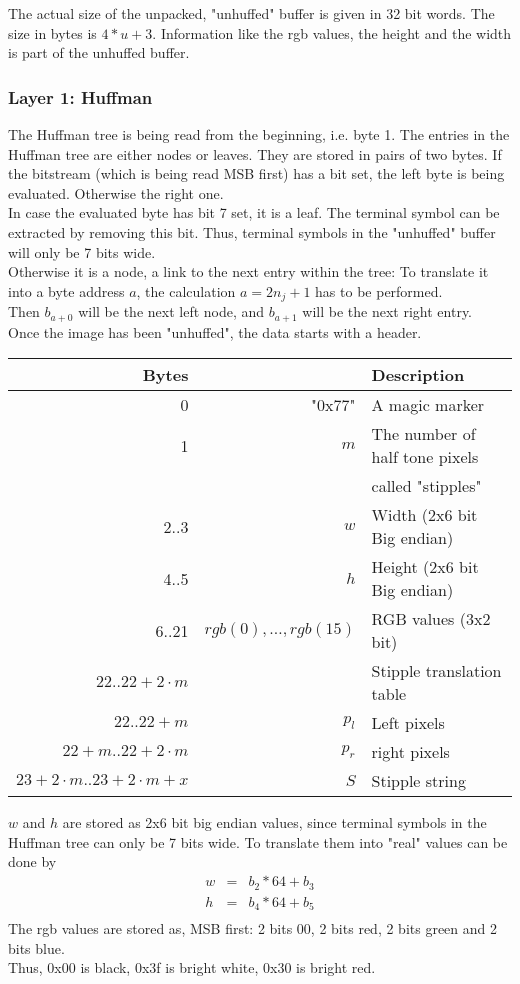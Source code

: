 \documentclass[11pt,twoside,openright]{report}
\begin{document}
The actual size of the unpacked, "unhuffed" buffer is given in 32 bit words. The size in bytes is $4*u+3$. Information like the rgb values, the height and the width is part of the unhuffed buffer.
\subsubsection{Layer 1: Huffman}
The Huffman tree is being read from the beginning, i.e. byte 1. The entries in the Huffman tree are either nodes or leaves. They are stored in pairs of two bytes. If the bitstream (which is being read MSB first) has a bit set, the left byte is being evaluated. Otherwise the right one.\\
In case the evaluated byte has bit 7 set, it is a leaf. The terminal symbol can be extracted by removing this bit. Thus, terminal symbols in the "unhuffed" buffer will only be 7 bits wide.\\
Otherwise it is a node, a link to the next entry within the tree: To translate it into a byte address $a$, the calculation $a=2 n_j+1$ has to be performed.\\
Then $b_{a+0}$ will be the next left node, and $b_{a+1}$ will be the next right entry.\\
Once the image has been "unhuffed", the data starts with a header.

\begin{tabular}{r|rl}
Bytes&&Description\\\hline
0&"0x77"&A magic marker\\
1&$m$&The number of half tone pixels\\
&& called "stipples"\\
2..3&$w$&Width (2x6 bit Big endian)\\
4..5&$h$&Height (2x6 bit Big endian)\\
6..21&$rgb(0),\dots,rgb(15)$&RGB values (3x2 bit)\\\hline
$22..22+2\cdot m$&&Stipple translation table\\
$22..22+m$&$p_l$&Left pixels\\
$22+m..22+2\cdot m$&$p_r$&right pixels\\\hline
$23+2\cdot m..23+2\cdot m+x$&$S$&Stipple string\\
\end{tabular}
$w$ and $h$ are stored as 2x6 bit big endian values, since terminal symbols in the Huffman tree can only be 7 bits wide. To translate them into "real" values can be done by
\begin{eqnarray*}
w&=&b_2*64+b_3\\
h&=&b_4*64+b_5\\
\end{eqnarray*}
The rgb values are stored as, MSB first: 2 bits 00, 2 bits red,  2 bits green and 2 bits blue.\\
Thus, 0x00 is black, 0x3f is bright white, 0x30 is bright red.
\end{document}
